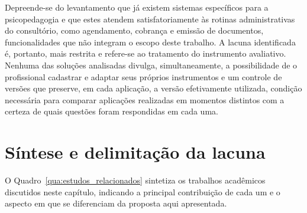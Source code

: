 Depreende-se do levantamento que já existem sistemas específicos para a psicopedagogia e que estes atendem satisfatoriamente às rotinas administrativas do consultório, como agendamento, cobrança e emissão de documentos, funcionalidades que não integram o escopo deste trabalho. A lacuna identificada é, portanto, mais restrita e refere-se ao tratamento do instrumento avaliativo. Nenhuma das soluções analisadas divulga, simultaneamente, a possibilidade de o profissional cadastrar e adaptar seus próprios instrumentos e um controle de versões que preserve, em cada aplicação, a versão efetivamente utilizada, condição necessária para comparar aplicações realizadas em momentos distintos com a certeza de quais questões foram respondidas em cada uma.

\section{Síntese e delimitação da lacuna}\label{sec:sintese_comparativa}

O Quadro~\ref{qua:estudos_relacionados} sintetiza os trabalhos acadêmicos discutidos neste capítulo, indicando a principal contribuição de cada um e o aspecto em que se diferenciam da proposta aqui apresentada.

